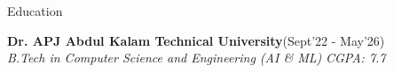 
\begin{rSection}{Education}
\vspace{-.55cm}
\item{\bf {\bf Dr. APJ Abdul Kalam Technical University}}\hfill{(Sept'22 - May'26)}\\
\emph{B.Tech in Computer Science and Engineering (AI \& ML)} \hfill \emph{CGPA: 7.7}\\
\end{rSection}
